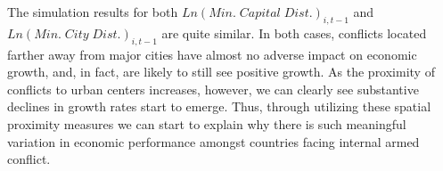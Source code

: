 The simulation results for both $Ln(Min. \; Capital \; Dist.)_{i,t-1}$ and $Ln(Min. \; City \; Dist.)_{i,t-1}$ are quite similar. In both cases, conflicts located farther away from major cities have almost no adverse impact on economic growth, and, in fact, are likely to still see positive growth. As the proximity of conflicts to urban centers increases, however, we can clearly see substantive declines in growth rates start to emerge. Thus, through utilizing these spatial proximity measures we can start to explain why there is such meaningful variation in economic performance amongst countries facing internal armed conflict.
